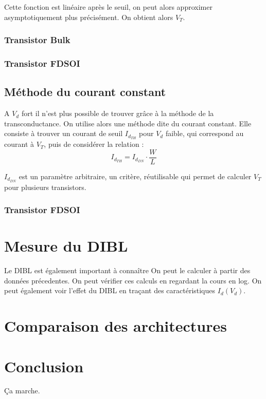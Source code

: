 \documentclass[a4paper,11pt]{report}
\begin{document}
Cette fonction est linéaire après le seuil, on peut alors approximer asymptotiquement plus précisément. On obtient alors $V_T$.
\subsection{Transistor Bulk}
\subsection{Transistor FDSOI}
\section{Méthode du courant constant}
A $V_d$ fort il n'est plus possible de trouver grâce à la méthode de la transconductance. On utilise alors une méthode dite du courant constant. Elle consiste à trouver un courant de seuil $I_{d_{TH}}$ pour $V_d$ faible, qui correspond au courant à $V_T$, puis de considérer la relation : \[I_{d_{TH}}=I_{d_{DN}}\cdot\dfrac{W}{L}\]

$I_{d_{DN}}$ est un paramètre arbitraire, un critère, réutilisable qui permet de calculer $V_T$ pour plusieurs transistors.

\subsection{Transistor FDSOI}


\chapter{Mesure du DIBL}
Le DIBL est également important à connaître %
On peut le calculer à partir des données précedentes.
On peut vérifier ces calculs en regardant la cours en log.
On peut également voir l'effet du DIBL en traçant des caractéristiques $I_d(V_d)$.

\chapter{Comparaison des architectures}

\chapter*{Conclusion}

Ça marche. %
\end{document}
